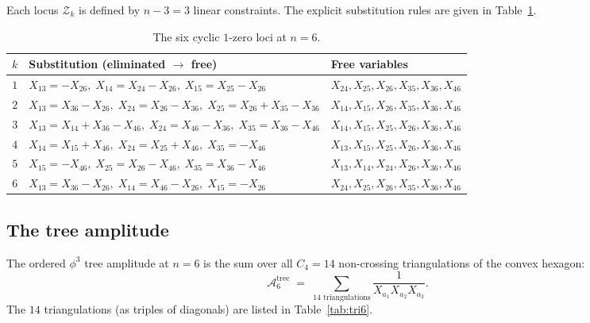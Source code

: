 \documentclass[11pt]{article}
\theoremstyle{plain}
\theoremstyle{definition}
\newcommand{\cA}{\mathcal{A}}
\newcommand{\cZ}{\mathcal{Z}}
\begin{document}
Each locus $\cZ_k$ is defined by $n-3 = 3$ linear constraints. The explicit
substitution rules are given in Table~\ref{tab:loci6}.

\begin{table}[ht]
\centering
\small
\begin{tabular}{c|l|l}
\toprule
$k$ & Substitution (eliminated $\to$ free) & Free variables \\
\midrule
$1$ & $X_{13} = -X_{26},\; X_{14} = X_{24}-X_{26},\; X_{15} = X_{25}-X_{26}$
    & $X_{24}, X_{25}, X_{26}, X_{35}, X_{36}, X_{46}$ \\
$2$ & $X_{13} = X_{36}-X_{26},\; X_{24} = X_{26}-X_{36},\; X_{25} = X_{26}+X_{35}-X_{36}$
    & $X_{14}, X_{15}, X_{26}, X_{35}, X_{36}, X_{46}$ \\
$3$ & $X_{13} = X_{14}+X_{36}-X_{46},\; X_{24} = X_{46}-X_{36},\; X_{35} = X_{36}-X_{46}$
    & $X_{14}, X_{15}, X_{25}, X_{26}, X_{36}, X_{46}$ \\
$4$ & $X_{14} = X_{15}+X_{46},\; X_{24} = X_{25}+X_{46},\; X_{35} = -X_{46}$
    & $X_{13}, X_{15}, X_{25}, X_{26}, X_{36}, X_{46}$ \\
$5$ & $X_{15} = -X_{46},\; X_{25} = X_{26}-X_{46},\; X_{35} = X_{36}-X_{46}$
    & $X_{13}, X_{14}, X_{24}, X_{26}, X_{36}, X_{46}$ \\
$6$ & $X_{13} = X_{36}-X_{26},\; X_{14} = X_{46}-X_{26},\; X_{15} = -X_{26}$
    & $X_{24}, X_{25}, X_{26}, X_{35}, X_{36}, X_{46}$ \\
\bottomrule
\end{tabular}
\caption{The six cyclic $1$-zero loci at $n=6$.}
\label{tab:loci6}
\end{table}

\subsection{The tree amplitude}

The ordered $\phi^3$ tree amplitude at $n=6$ is the sum over all $C_4 = 14$
non-crossing triangulations of the convex hexagon:
\begin{equation}
\cA_6^{\mathrm{tree}} \;=\; \sum_{\text{14 triangulations}} \frac{1}{X_{a_1} X_{a_2} X_{a_3}}.
\label{eq:tree6}
\end{equation}
The $14$ triangulations (as triples of diagonals) are listed in Table~\ref{tab:tri6}.
\end{document}
